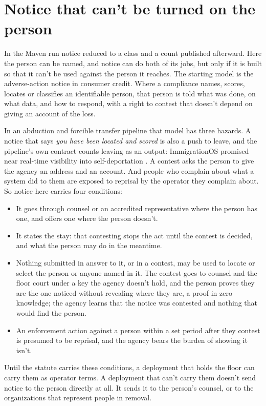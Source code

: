\section{Notice that can't be turned on the person}
\label{sec:11.6}
In the Maven run notice reduced to a class and a count published afterward. Here the person can be named, and notice can do both of its jobs, but only if it is built so that it can't be used against the person it reaches. The starting model is the adverse-action notice in consumer credit. Where a compliance names, scores, locates or classifies an identifiable person, that person is told what was done, on what data, and how to respond, with a right to contest that doesn't depend on giving an account of the loss.

In an abduction and forcible transfer pipeline that model has three hazards. A notice that says \emph{you have been located and scored} is also a push to leave, and the pipeline's own contract counts leaving as an output: ImmigrationOS promised near real-time visibility into self-deportation \autocite{Ho2025ImmigrationOS}. A contest asks the person to give the agency an address and an account. And people who complain about what a system did to them are exposed to reprisal by the operator they complain about. So notice here carries four conditions:

\begin{itemize}
\item It goes through counsel or an accredited representative where the person has one, and offers one where the person doesn't.
\item It states the stay: that contesting stops the act until the contest is decided, and what the person may do in the meantime.
\item Nothing submitted in answer to it, or in a contest, may be used to locate or select the person or anyone named in it. The contest goes to counsel and the floor court under a key the agency doesn't hold, and the person proves they are the one noticed without revealing where they are, a proof in zero knowledge; the agency learns that the notice was contested and nothing that would find the person.
\item An enforcement action against a person within a set period after they contest is presumed to be reprisal, and the agency bears the burden of showing it isn't.
\end{itemize}

Until the statute carries these conditions, a deployment that holds the floor can carry them as operator terms. A deployment that can't carry them doesn't send notice to the person directly at all. It sends it to the person's counsel, or to the organizations that represent people in removal.

